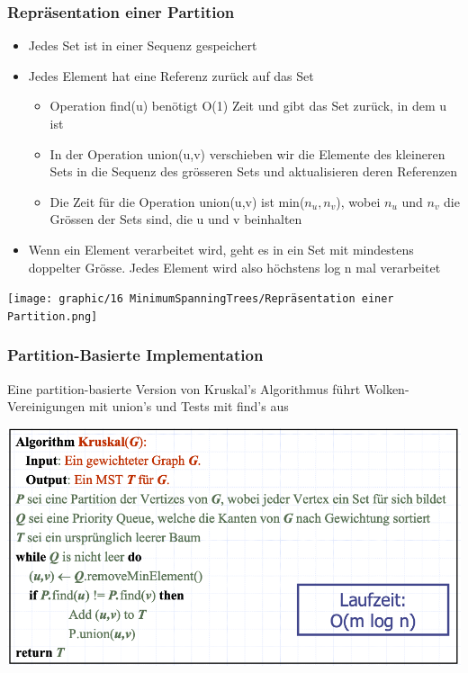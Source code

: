 \subsubsection{Repräsentation einer Partition}
\begin{itemize}
    \item Jedes Set ist in einer Sequenz gespeichert
    \item Jedes Element hat eine Referenz zurück auf das Set
    \begin{itemize}
        \item Operation find(u) benötigt O(1) Zeit und gibt das Set zurück, in dem u ist
        \item In der Operation union(u,v) verschieben wir die Elemente des kleineren Sets in die Sequenz des grösseren Sets und aktualisieren deren Referenzen
        \item Die Zeit für die Operation union(u,v) ist min($n_u,n_v$), wobei $n_u$ und $n_v$ die Grössen der Sets sind, die u und v beinhalten
    \end{itemize}
    \item Wenn ein Element verarbeitet wird, geht es in ein Set mit mindestens doppelter Grösse. Jedes Element wird also höchstens log n mal verarbeitet
\end{itemize}
\begin{center}
    \texttt{[image: graphic/16 MinimumSpanningTrees/Repräsentation einer Partition.png]}
\end{center}
\vspace{-8pt}
\subsubsection{Partition-Basierte Implementation}
Eine partition-basierte Version von Kruskal’s Algorithmus führt Wolken-Vereinigungen mit union’s und Tests mit find’s aus
\begin{center}
    \includegraphics[scale=.35]{graphic/16 MinimumSpanningTrees/Partition-Basierte Implementation.png}
\end{center}
\vspace{-8pt}


